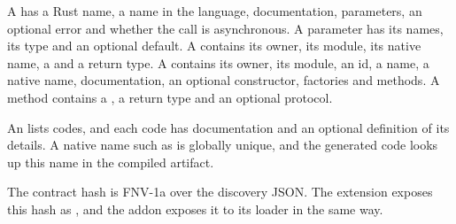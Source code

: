\documentclass[sigconf,nonacm]{acmart}
\begin{document}
A  has a Rust name, a name in the language, documentation, parameters, an optional error and whether the call is asynchronous. A parameter has its names, its type and an optional default. A  contains its owner, its module, its native name, a  and a return type. A  contains its owner, its module, an id, a name, a native name, documentation, an optional constructor, factories and methods. A method contains a , a return type and an optional protocol.

An  lists codes, and each code has documentation and an optional definition of its details. A native name such as  is globally unique, and the generated code looks up this name in the compiled artifact.

The contract hash is FNV-1a over the discovery JSON. The extension exposes this hash as , and the addon exposes it to its loader in the same way.



\end{document}
